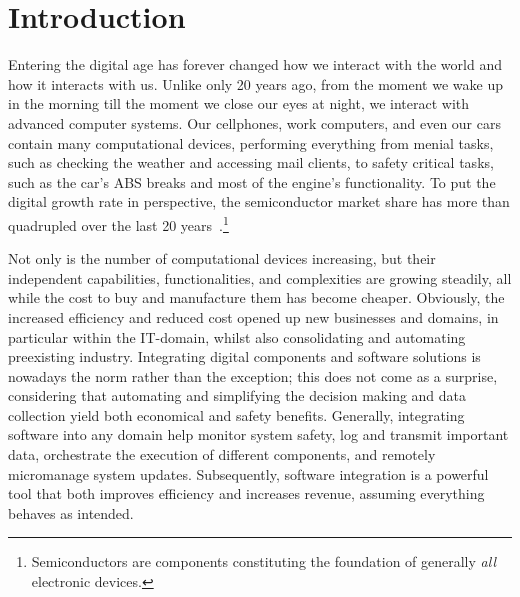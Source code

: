 \chapter{Introduction}%
\label{ch:intro}%
Entering the digital age has forever changed how we interact with the world and how it interacts with us.
Unlike only 20 years ago, from the moment we wake up in the morning till the moment we close our eyes at night, we interact with advanced computer systems.
Our cellphones, work computers, and even our cars contain many computational devices, performing everything from menial tasks, such as checking the weather and accessing mail clients, to safety critical tasks, such as the car's ABS breaks and most of the engine's functionality.
To put the digital growth rate in perspective, the semiconductor market share has more than quadrupled over the last 20 years~\cite{statista:2022}.\footnote{Semiconductors are components constituting the foundation of generally \emph{all} electronic devices.}

Not only is the number of computational devices increasing, but their independent capabilities, functionalities, and complexities are growing steadily, all while the cost to buy and manufacture them has become cheaper.
Obviously, the increased efficiency and reduced cost opened up new businesses and domains, in particular within the IT-domain, whilst also consolidating and automating preexisting industry.
Integrating digital components and software solutions is nowadays the norm rather than the exception; this does not come as a surprise, considering that automating and simplifying the decision making and data collection yield both economical and safety benefits.
Generally, integrating software into any domain help monitor system safety, log and transmit important data, orchestrate the execution of different components, and remotely micromanage system updates.
Subsequently, software integration is a powerful tool that both improves efficiency and increases revenue, assuming everything behaves as intended.

